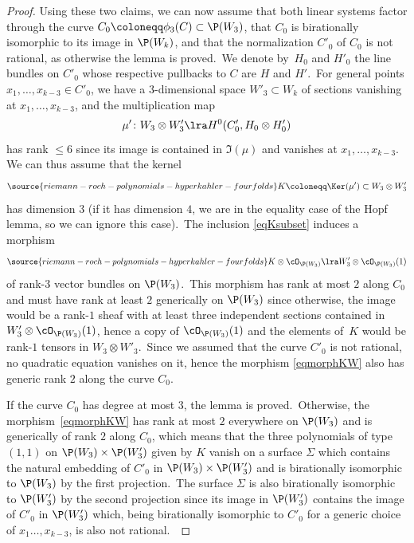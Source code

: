 \begin{proof}
Using these two claims, we can now assume that both linear systems factor through  the curve $C_0\coloneqq\phi_3(C)\subset \P(W_3)$,  that $C_0$ is birationally isomorphic to its image in $\P(W_k)$, and that  the normalization  $C'_0$ of $C_0$ is not rational, as otherwise the lemma is proved.\ We  denote by~$H_0$ and $H'_0$ the line bundles on  $C'_0$  whose respective pullbacks to $C$ are $H$ and $H'$.\      For    general points $x_1,\ldots,x_{k-3}\in C'_0$, we have a
$3$-dimensional space $W'_3
\subset W_k$ of sections vanishing at $x_1,\ldots,x_{k-3}$, and the multiplication map
$$\mu'\colon  W_3\otimes W'_3\lra H^0(C'_0, H_0\otimes H'_0)$$
has rank $\leq 6$ since its image is contained in $ \Im (\mu)$ and vanishes at $x_1,\dots,x_{k-3}$.
We can thus assume that the kernel
\begin{equation}
\label{eqKsubset}
\source{riemann-roch-polynomials-hyperkahler-fourfolds}
K\coloneqq  \Ker (\mu')\subset  W_3\otimes W'_3
\end{equation}
has dimension $3$ (if it has dimension $4$,   we are in the equality case of the Hopf lemma, so we can ignore this case).\
The inclusion \eqref{eqKsubset} induces a morphism
\begin{equation}
\label{eqmorphKW}
\source{riemann-roch-polynomials-hyperkahler-fourfolds}
K\otimes \cO_{\P(  W_3)}\lra  W'_3\otimes  \cO_{\P(  W_3)}(1)
\end{equation}
of rank-$3$ vector bundles
on $\P(W_3)$.\ This morphism  has rank at most $ 2$ along $C_0$ and   must have rank at least $2$ generically on $\P(W_3)$ since otherwise, the image would be  a rank-$1$ sheaf with at least three independent sections contained in $W'_3\otimes  \cO_{\P(  W_3)}(1)$, hence a copy of  $\cO_{\P(  W_3)}(1)$ and the elements of~$K$ would be rank-$1$ tensors in $W_3\otimes W'_3$.\   Since we assumed that the curve $C'_0$ is not rational, no quadratic equation vanishes on it, hence  the morphism \eqref{eqmorphKW} also has generic rank $2$ along the curve $C_0$.

If the curve  $C_0$ has degree at most $ 3$,  the lemma is proved.\ Otherwise, the morphism~\eqref{eqmorphKW}  has   rank at most $ 2$ everywhere on $\P(  W_3)$ and is generically of rank $2$ along $C_0$, which means that the three polynomials of type $(1,1)$ on $\P( W_3)\times \P(  W'_3)$ given by $K$ vanish on  a surface $\Sigma$ which contains the natural  embedding of $C'_0$ in $\P( W_3)\times \P(  W'_3)$ and is birationally isomorphic to  $\P(  W_3)$ by the first projection.\ The surface $\Sigma$  is  also birationally isomorphic  to  $\P( W'_3)$ by the second projection since its image in $\P( W'_3)$ contains the image of $C'_0$ in $\P( W'_3)$ which, being birationally isomorphic to $C'_0$ for a generic choice of $x_1\ldots,x_{k-3}$, is also not rational.\


\end{proof}
